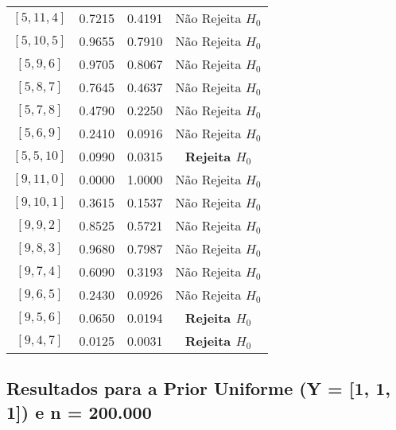 \documentclass[12pt, a4paper]{article}
\begin{document}
\begin{table}[H]
\begin{tabular}{cccc}
        {$[5, 11, 4]$} & 0.7215 & 0.4191 & Não Rejeita $H_0$ \\
        {$[5, 10, 5]$} & 0.9655 & 0.7910 & Não Rejeita $H_0$ \\
        {$[5, 9, 6]$}  & 0.9705 & 0.8067 & Não Rejeita $H_0$ \\
        {$[5, 8, 7]$}  & 0.7645 & 0.4637 & Não Rejeita $H_0$ \\
        {$[5, 7, 8]$}  & 0.4790 & 0.2250 & Não Rejeita $H_0$ \\
        {$[5, 6, 9]$}  & 0.2410 & 0.0916 & Não Rejeita $H_0$ \\
        {$[5, 5, 10]$} & 0.0990 & 0.0315 & \textbf{Rejeita $H_0$} \\
        \midrule
        {$[9, 11, 0]$} & 0.0000 & 1.0000 & Não Rejeita $H_0$ \\
        {$[9, 10, 1]$} & 0.3615 & 0.1537 & Não Rejeita $H_0$ \\
        {$[9, 9, 2]$}  & 0.8525 & 0.5721 & Não Rejeita $H_0$ \\
        {$[9, 8, 3]$}  & 0.9680 & 0.7987 & Não Rejeita $H_0$ \\
        {$[9, 7, 4]$}  & 0.6090 & 0.3193 & Não Rejeita $H_0$ \\
        {$[9, 6, 5]$}  & 0.2430 & 0.0926 & Não Rejeita $H_0$ \\
        {$[9, 5, 6]$}  & 0.0650 & 0.0194 & \textbf{Rejeita $H_0$} \\
        {$[9, 4, 7]$}  & 0.0125 & 0.0031 & \textbf{Rejeita $H_0$} \\
        \bottomrule
    \end{tabular}
\end{table}

\subsection{Resultados para a Prior Uniforme (Y = [1, 1, 1]) e n = 200.000}
\end{document}

